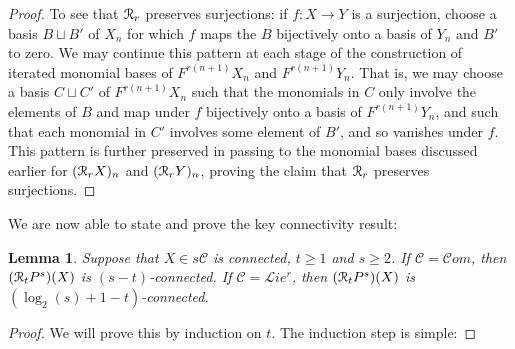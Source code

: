 \documentclass[11pt]{amsart} \renewcommand{\baselinestretch}{1.4}
\theoremstyle{plain}
\newtheorem{lem}[thm]{Lemma}
\theoremstyle{definition}
\renewcommand{\to}{\longrightarrow}
\newcommand{\scrL}{\mathscr{L}}
\newcommand{\scrC}{\mathscr{C}}
\newcommand{\calR}{\mathcal{R}}
\newcommand{\calc}{\mathcal{C}}
\newcommand{\algs}{{\scrC\!\textit{om}}}
\newcommand{\restliealgs}{{\scrL\!\textit{ie}^\textit{r}}}
\newcommand{\algcat}{{\calc}}%
\newcommand{\caldup}[1]{\calR_{\smash{#1}}}
\newcommand{\barConstructionMightAbbreviate}{b}
\begin{document}
\begin{Bousfield-Kan spectral sequence}
\begin{proof}
To see that $\caldup{r}$ preserves surjections: if $f:X\to Y$ is a surjection, choose a basis $B\sqcup B'$ of $X_n$ for  which $f$ maps the $B$ bijectively onto a basis of $Y_n$ and $B'$ to zero. We may continue this pattern at each stage of the construction of iterated monomial bases of $F^{r(n+1)}X_n$ and $F^{r(n+1)}Y_n$. That is, we may choose a  basis $C\sqcup C'$ of $F^{r(n+1)}X_n$  such that the monomials in $C$ only involve the elements of $B$ and map under $f$ bijectively onto a basis of $F^{r(n+1)}Y_n$, and such that each monomial in $C'$ involves some element of $B'$, and so vanishes under $f$. This pattern is further preserved in passing to the monomial bases discussed earlier for $(\caldup{r}X)_n$ and $(\caldup{r}Y)_n$, proving the claim that $\caldup{r}$ preserves surjections. 
%
%
\end{proof}
We are now able to state and prove the key connectivity result:
\begin{lem}
\label{connectivityOfDerivedPowers}
Suppose that $X\in s\algcat$ is connected, $t\geq1$ and $s\geq2$. If $\algcat=\algs$, then $(\caldup{t}P^{s})(X)$ is $(s-t)$-connected. If $\algcat=\restliealgs$, then $(\caldup{t}P^{s})(X)$ is  $(\log_2(s)+1-t)$-connected.
\end{lem}
\begin{proof}
We will prove this by induction on $t$. The induction step is simple: %

\end{proof}
\end{Bousfield-Kan spectral sequence}
\end{document}
